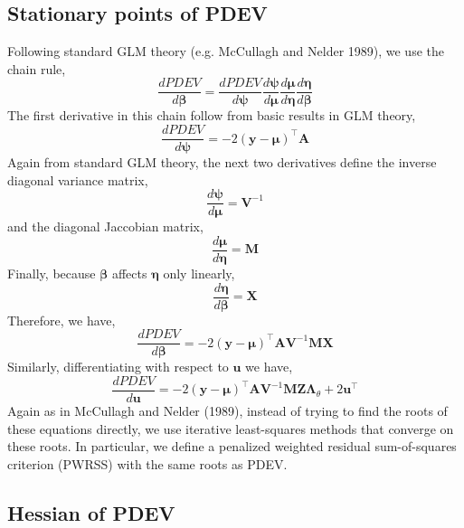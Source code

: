 \documentclass{jss}
\begin{document}
\subsection{Stationary points of PDEV}

Following standard GLM theory (e.g. McCullagh and Nelder 1989), we use the chain rule,
\begin{displaymath}
\frac{d PDEV}{d \bm\beta} = 
\frac{d PDEV}{d \bm\psi}
\frac{d \bm\psi}{d \bm\mu}
\frac{d \bm\mu}{d \bm\eta}
\frac{d \bm\eta}{d \bm\beta}
\end{displaymath}
The first derivative in this chain follow from basic results in GLM theory,
\begin{displaymath}
\frac{d PDEV}{d \bm\psi} = 
-2(\bm y - \bm\mu)^\top \bm A
\end{displaymath}
Again from standard GLM theory, the next two derivatives define the inverse diagonal variance
matrix,
\begin{displaymath}
\frac{d \bm\psi}{d \bm\mu} = \bm V^{-1}
\end{displaymath}
and the diagonal Jaccobian matrix,
\begin{displaymath}
\frac{d \bm\mu}{d \bm\eta} = \bm M
\end{displaymath}
Finally, because $\bm\beta$ affects $\bm\eta$ only linearly,
\begin{displaymath}
\frac{d \bm\eta}{d \bm\beta} = \bm X
\end{displaymath}
Therefore, we have,
\begin{equation}
\frac{d PDEV}{d \bm\beta} = 
-2(\bm y - \bm\mu)^\top \bm A
\bm V^{-1}
\bm M
\bm X
\label{eq:dPDEVdbeta}
\end{equation}
Similarly, differentiating with respect to $\bm u$ we have,
\begin{equation}
  \frac{d PDEV}{d \bm u} = 
  -2(\bm y - \bm\mu)^\top \bm A
  \bm V^{-1}
  \bm M
  \bm Z \bm\Lambda_\theta +
  2\bm u^\top
  \label{eq:dPDEVdu}
\end{equation}
Again as in McCullagh and Nelder (1989), instead of trying to find the
roots of these equations directly, we use iterative least-squares
methods that converge on these roots. In particular, we define a
penalized weighted residual sum-of-squares criterion (PWRSS) with the
same roots as PDEV.

\subsection{Hessian of PDEV}
\end{document}
